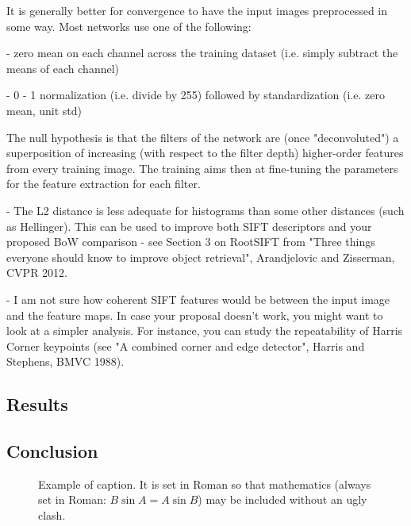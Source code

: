 \documentclass[10pt,twocolumn,letterpaper]{article}
\begin{document}
It is generally better for convergence to have the input images preprocessed in some way. Most networks use one of the following:

- zero mean on each channel across the training dataset (i.e. simply subtract the means of each channel)

- 0 - 1 normalization (i.e. divide by 255) followed by standardization (i.e. zero mean, unit std)

The null hypothesis is that the filters of the network are (once "deconvoluted") a superposition of increasing (with respect to the filter depth) higher-order features from every training image. The training aims then at fine-tuning the parameters for the feature extraction for each filter.

- The L2 distance is less adequate for histograms than some other distances (such as Hellinger). This can be used to improve both SIFT descriptors and your proposed BoW comparison - see Section 3 on RootSIFT from "Three things everyone should know to improve object retrieval", Arandjelovic and Zisserman, CVPR 2012.

- I am not sure how coherent SIFT features would be between the input image and the feature maps. In case your proposal doesn't work, you might want to look at a simpler analysis. For instance, you can study the repeatability of Harris Corner keypoints (see "A combined corner and edge detector", Harris and Stephens, BMVC 1988).

\subsection{Results}


\subsection{Conclusion}



\begin{figure}[t]
\begin{center}
\fbox{\rule{0pt}{2in} \rule{0.9\linewidth}{0pt}}
\end{center}
   \caption{Example of caption.  It is set in Roman so that mathematics
   (always set in Roman: $B \sin A = A \sin B$) may be included without an
   ugly clash.}
\label{fig:long}
\label{fig:onecol}
\end{figure}
\end{document}
